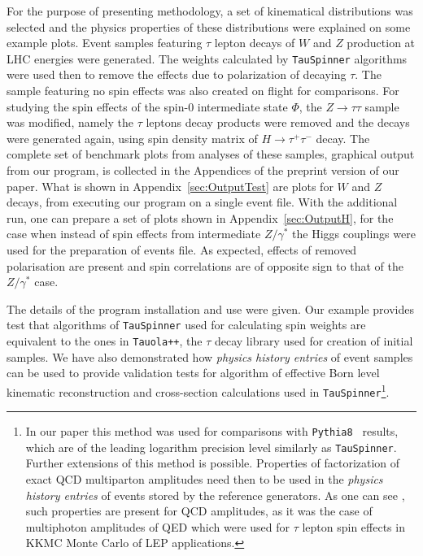 \documentclass{article}
\begin{document}
 
For the purpose of presenting methodology, a set of kinematical distributions was selected and the physics properties  
of these distributions were  explained on some example plots. 
Event samples featuring $\tau$ lepton decays  of $W$ and $Z$ production  at LHC energies were generated.
The weights calculated by {\tt TauSpinner} algorithms were  used then to remove the effects due to polarization of decaying $\tau$.
The sample featuring no spin effects was also created on flight for comparisons.
For studying the spin effects of the spin-0 intermediate state $\Phi$, the $Z \to \tau \tau $ sample was modified, namely 
the $\tau$ leptons decay products were removed and the decays were generated again, using spin density matrix of $H \to \tau^+ \tau^- $ decay.
The complete set of benchmark plots from analyses of these samples, graphical output from 
our program,  is collected in the Appendices of the preprint version of our paper.
What is shown in Appendix~\ref{sec:OutputTest}  are plots  for $W$ and $Z$ 
decays, from executing our  program on a single event file. With the additional run,
one can prepare a set of plots shown in Appendix~\ref{sec:OutputH}, for the case when instead of spin effects from intermediate $Z/\gamma^*$ 
the  Higgs couplings were used for the preparation of events file. 
As expected, effects of removed polarisation are present and 
spin correlations are of opposite sign 
to that of the $Z/\gamma^*$ case. 



The details of the program installation and use were  given. Our example provides test that
algorithms of {\tt TauSpinner} used for calculating spin weights are equivalent to the ones in {\tt Tauola++},
the $\tau$ decay library used for creation of initial samples.
 We have also demonstrated  how {\it physics history entries} of event samples can be used
to provide  validation tests for  algorithm of effective Born level kinematic reconstruction and cross-section calculations used in {\tt TauSpinner}\footnote{In our paper this method
was used for comparisons with
{\tt Pythia8 } results, which are of the  leading logarithm precision 
level similarly as  {\tt TauSpinner}. Further extensions of this
method is possible. Properties of factorization of exact QCD multiparton 
amplitudes need then to be used in the {\it physics history entries} of
events  stored by the reference generators. As one can see   
 \cite{vanHameren:2008dy}, such properties are present for  QCD amplitudes, 
as it 
was the case of multiphoton amplitudes of QED which were used for 
$\tau$ lepton spin effects in KKMC Monte Carlo \cite{Jadach:1999vf}
of LEP applications.}. 
\end{document}
